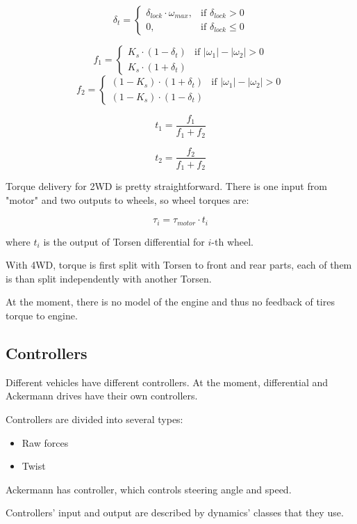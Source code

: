 \documentclass[a4paper,11pt]{article}
\begin{document}
$$
\delta_t =
\begin{cases}
	\delta_{lock} \cdot \omega_{max}, & \mbox{if } \delta_{lock} >  0 \\
	0, & \mbox{if } \delta_{lock} \leq 0
\end{cases}
$$

$$
f_1 =
\begin{cases}
	K_s \cdot (1 - \delta_t) & \mbox{if } |\omega_1| - |\omega_2| > 0 \\
	K_s \cdot (1 + \delta_t)
\end{cases}
$$
$$
f_2 =
\begin{cases}
	(1 - K_s) \cdot (1 + \delta_t) & \mbox{if } |\omega_1| - |\omega_2| > 0 \\
	(1 - K_s) \cdot (1 - \delta_t)
\end{cases}
$$

$$
t_1 = \frac{f_1}{f_1 + f_2}
$$

$$
t_2 = \frac{f_2}{f_1 + f_2}
$$

Torque delivery for 2WD is pretty straightforward. There is one input from "motor" and two outputs to wheels, so wheel torques are:

$$
\tau_i = \tau_{motor} \cdot t_i
$$

where $t_i$ is the output of Torsen differential for $i$-th wheel.

With 4WD, torque is first split with Torsen to front and rear parts, each of them is than split independently with another Torsen.

At the moment, there is no model of the engine and thus no feedback of tires torque to engine.


\subsection{Controllers} \label{sec:controllers}

Different vehicles have different controllers.
At the moment, differential and Ackermann drives have their own controllers.

Controllers are divided into several types:
\begin{itemize}
\item Raw forces
\item Twist
\end{itemize}

Ackermann has controller, which controls steering angle and speed.

Controllers' input and output are described by dynamics' classes that they use.
\end{document}
